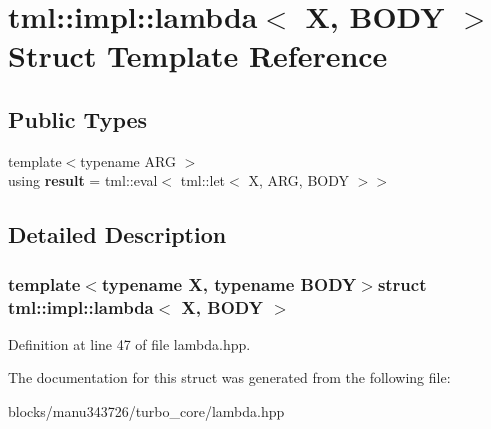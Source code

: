 \hypertarget{structtml_1_1impl_1_1lambda}{\section{tml\+:\+:impl\+:\+:lambda$<$ X, B\+O\+D\+Y $>$ Struct Template Reference}
\label{structtml_1_1impl_1_1lambda}
}
\subsection*{Public Types}
\begin{DoxyCompactItemize}
\item 
\hypertarget{structtml_1_1impl_1_1lambda_a9be72e93ddc8db4863ab19e423462e27}{{\footnotesize template$<$typename A\+R\+G $>$ }\\using {\bfseries result} = tml\+::eval$<$ tml\+::let$<$ X, A\+R\+G, B\+O\+D\+Y $>$$>$}\label{structtml_1_1impl_1_1lambda_a9be72e93ddc8db4863ab19e423462e27}

\end{DoxyCompactItemize}


\subsection{Detailed Description}
\subsubsection*{template$<$typename X, typename B\+O\+D\+Y$>$struct tml\+::impl\+::lambda$<$ X, B\+O\+D\+Y $>$}



Definition at line 47 of file lambda.\+hpp.



The documentation for this struct was generated from the following file\+:\begin{DoxyCompactItemize}
\item 
blocks/manu343726/turbo\+\_\+core/lambda.\+hpp\end{DoxyCompactItemize}
